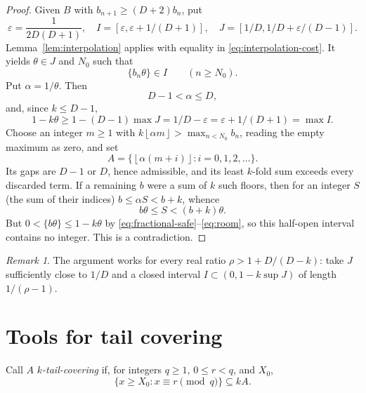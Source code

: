 \documentclass[11pt,a4paper,reqno]{amsart}
\theoremstyle{definition}
\theoremstyle{remark}
\newtheorem{remark}[theorem]{Remark}
\newcommand{\floor}[1]{\left\lfloor #1\right\rfloor}
\begin{document}
\begin{proof}
Given $B$ with $b_{n+1}\ge(D+2)b_n$, put
\[
 \varepsilon=\frac1{2D(D+1)},\quad
 I=[\varepsilon,\varepsilon+1/(D+1)],\quad
 J=[1/D,1/D+\varepsilon/(D-1)].
\]
Lemma~\ref{lem:interpolation} applies with equality in
\eqref{eq:interpolation-cost}. It yields $\theta\in J$ and $N_0$ such that
\begin{equation}\label{eq:fractional-safe}
 \{b_n\theta\}\in I\qquad(n\ge N_0).
\end{equation}
Put $\alpha=1/\theta$. Then
\begin{equation}\label{eq:slope-range}
 D-1<\alpha\le D,
\end{equation}
and, since $k\le D-1$,
\begin{equation}\label{eq:room}
 1-k\theta\ge1-(D-1)\max J
 =1/D-\varepsilon=\varepsilon+1/(D+1)=\max I.
\end{equation}
Choose an integer $m\ge1$ with
$k\floor{\alpha m}>\max_{n<N_0}b_n$, reading the empty maximum as zero, and set
\[
 A=\{\floor{\alpha(m+i)}:i=0,1,2,\ldots\}.
\]
Its gaps are $D-1$ or $D$, hence admissible, and its least $k$-fold sum
exceeds every discarded term. If a remaining $b$ were a sum of $k$ such
floors, then for an integer $S$ (the sum of their indices)
$b\le\alpha S<b+k$, whence
\[
 b\theta\le S<(b+k)\theta.
\]
But $0<\{b\theta\}\le1-k\theta$ by \eqref{eq:fractional-safe}--\eqref{eq:room},
so this half-open interval contains no integer. This is a contradiction.
\end{proof}
\begin{remark}
The argument works for every real ratio $\rho>1+D/(D-k)$: take $J$
sufficiently close to $1/D$ and a closed interval
$I\subset(0,1-k\sup J)$ of length $1/(\rho-1)$.
\end{remark}

\section{Tools for tail covering}
Call $A$ \emph{$k$-tail-covering} if, for integers $q\ge1$, $0\le r<q$,
and $X_0$,
\begin{equation}\label{eq:tail-covering}
 \{x\ge X_0:x\equiv r\pmod q\}\subseteq kA.
\end{equation}
\end{document}
